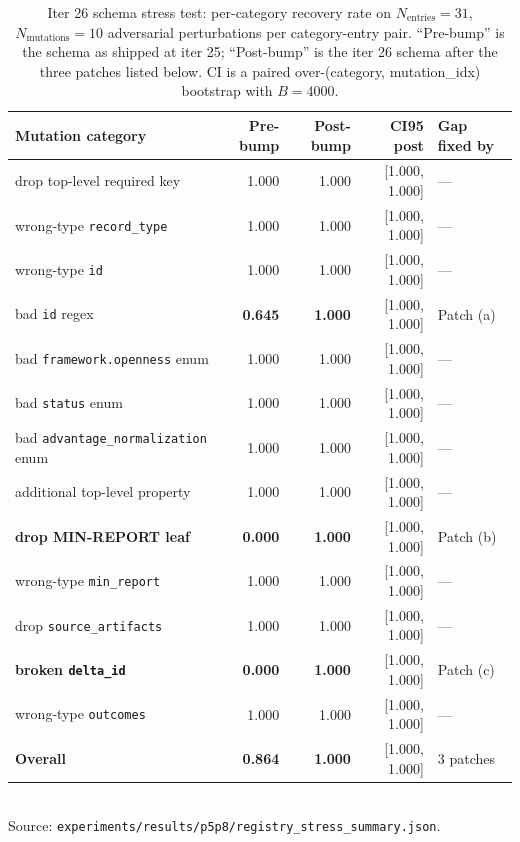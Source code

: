 \begin{table}[t]
\centering
\caption{Iter 26 schema stress test: per-category recovery rate on
$N_\text{entries}=31$, $N_\text{mutations}=10$ adversarial perturbations
per category-entry pair. ``Pre-bump'' is the schema as shipped at iter 25;
``Post-bump'' is the iter 26 schema after the three patches listed below. CI
is a paired over-(category, mutation\_idx) bootstrap with $B=4000$.}
\label{tab:p6-stress}
\small
\begin{tabular}{lrrrl}
\toprule
Mutation category & Pre-bump & Post-bump & CI95 post & Gap fixed by \\
\midrule
drop top-level required key  & 1.000 & 1.000 & [1.000, 1.000] & --- \\
wrong-type \texttt{record\_type} & 1.000 & 1.000 & [1.000, 1.000] & --- \\
wrong-type \texttt{id}       & 1.000 & 1.000 & [1.000, 1.000] & --- \\
bad \texttt{id} regex        & \textbf{0.645} & \textbf{1.000} & [1.000, 1.000] & Patch (a) \\
bad \texttt{framework.openness} enum & 1.000 & 1.000 & [1.000, 1.000] & --- \\
bad \texttt{status} enum     & 1.000 & 1.000 & [1.000, 1.000] & --- \\
bad \texttt{advantage\_normalization} enum & 1.000 & 1.000 & [1.000, 1.000] & --- \\
additional top-level property & 1.000 & 1.000 & [1.000, 1.000] & --- \\
\textbf{drop MIN-REPORT leaf}     & \textbf{0.000} & \textbf{1.000} & [1.000, 1.000] & Patch (b) \\
wrong-type \texttt{min\_report}  & 1.000 & 1.000 & [1.000, 1.000] & --- \\
drop \texttt{source\_artifacts} & 1.000 & 1.000 & [1.000, 1.000] & --- \\
\textbf{broken \texttt{delta\_id}}        & \textbf{0.000} & \textbf{1.000} & [1.000, 1.000] & Patch (c) \\
wrong-type \texttt{outcomes}   & 1.000 & 1.000 & [1.000, 1.000] & --- \\
\midrule
\textbf{Overall} & \textbf{0.864} & \textbf{1.000} & [1.000, 1.000] & 3 patches \\
\bottomrule
\end{tabular}\\
\footnotesize{Source:
\texttt{experiments/results/p5p8/registry\_stress\_summary.json}.}
\end{table}

